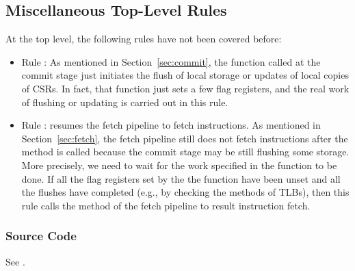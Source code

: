 \subsection{Miscellaneous Top-Level Rules}\label{sec:misc-rules}

At the top level, the following rules have not been covered before:
\begin{itemize}
    \item Rule : As mentioned in Section~\ref{sec:commit}, the  function called at the commit stage just initiates the flush of local storage or updates of local copies of CSRs.
    In fact, that function just sets a few flag registers, and the real work of flushing or updating is carried out in this rule.
    \item Rule : resumes the fetch pipeline to fetch instructions.
    As mentioned in Section~\ref{sec:fetch}, the fetch pipeline still does not fetch instructions after the  method is called because the commit stage may be still flushing some storage.
    More precisely, we need to wait for the work specified in the  function to be done.
    If all the flag registers set by the the  function have been unset and all the flushes have completed (e.g., by checking the  methods of TLBs), then this rule calls the  method of the fetch pipeline to result instruction fetch.
\end{itemize}

\subsubsection{Source Code}
See .
